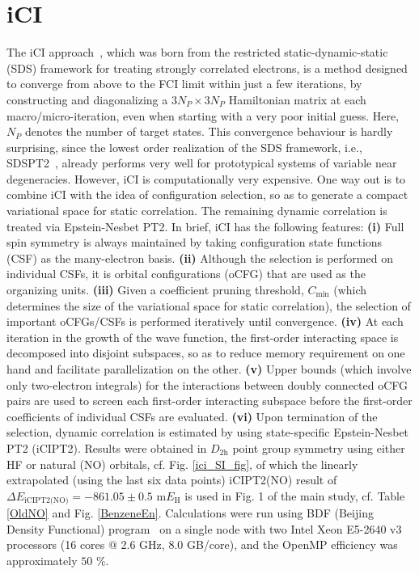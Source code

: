 \documentclass[journal=jcp,manuscript=suppinfo]{achemso}
\begin{document}
\section{iCI}

The iCI approach~\cite{liu_hoffmann_ici_jctc_2016,liu_hoffmann_ici_jctc_2020}, which was born from the restricted static-dynamic-static~\cite{liu_hoffmann_sds_tca_2014} (SDS) framework for treating strongly correlated electrons, is a method designed to converge from above to the FCI limit within just a few iterations, by constructing and diagonalizing a $3N_P\times3N_P$ Hamiltonian matrix at each macro/micro-iteration, even when starting with a very poor initial guess. Here, $N_P$ denotes the number of target states. This convergence behaviour is hardly surprising, since the lowest order realization of the SDS framework, i.e., SDSPT2~\cite{liu_hoffmann_sdspt2_mp_2017}, already performs very well for prototypical systems of variable near degeneracies. However, iCI is computationally very expensive. One way out is to combine iCI with the idea of configuration selection, so as to generate a compact variational space for static correlation. The remaining dynamic correlation is treated via Epstein-Nesbet PT2. In brief, iCI has the following features: {\bf{(i)}} Full spin symmetry is always maintained by taking configuration state functions (CSF) as the many-electron basis. {\bf{(ii)}} Although the selection is performed on individual CSFs, it is orbital configurations (oCFG) that are used as the organizing units. {\bf{(iii)}} Given a coefficient pruning threshold, $C_{\text{min}}$ (which determines the size of the variational space for static correlation), the selection of important oCFGs/CSFs is performed iteratively until convergence. {\bf{(iv)}} At each iteration in the growth of the wave function, the first-order interacting space is decomposed into disjoint subspaces, so as to reduce memory requirement on one hand and facilitate parallelization on the other. {\bf{(v)}} Upper bounds (which involve only two-electron integrals) for the interactions between doubly connected oCFG pairs are used to screen each first-order interacting subspace before the first-order coefficients of individual CSFs are evaluated. {\bf{(vi)}} Upon termination of the selection, dynamic correlation is estimated by using state-specific Epstein-Nesbet PT2 (iCIPT2). Results were obtained in $D_{2\text{h}}$ point group symmetry using either HF or natural (NO) orbitals, cf. Fig. \ref{ici_SI_fig}, of which the linearly extrapolated (using the last six data points) iCIPT2(NO) result of $\Delta E_{\text{iCIPT2(NO)}} = -861.05\pm0.5$ m$E_{\text{H}}$ is used in Fig. 1 of the main study, cf. Table \ref{OldNO} and Fig. \ref{BenzeneEn}. Calculations were run using BDF (Beijing Density Functional) program~\cite{bdf_prog_tca_1997,bdf_prog_jcp_2020} on a single node with two Intel Xeon E5-2640 v3 processors (16 cores $@$ 2.6 GHz, 8.0 GB/core), and the OpenMP efficiency was approximately $50$ $\%$.\\
\end{document}

